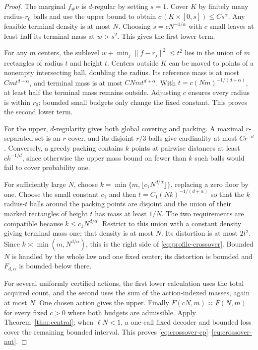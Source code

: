 \begin{proof}
The marginal $f_\#\nu$ is $d$-regular by setting $s=1$. Cover $K$ by finitely many radius-$r_0$ balls and use the upper bound to obtain
$\sigma(K\times[0,s])\le C s^\alpha$. Any feasible terminal density is at most $N$. Choosing $s=cN^{-1/\alpha}$ with $c$ small leaves at least half its terminal mass at $w>s^2$. This gives the first lower term.

For any $m$ centers, the sublevel $w+\min_j\|f-r_j\|^2\le t^2$ lies in the union of $m$ rectangles of radius $t$ and height $t$. Centers outside $K$ can be moved to points of a nonempty intersecting ball, doubling the radius. Its reference mass is at most $Cmt^{d+\alpha}$, and terminal mass is at most $CNmt^{d+\alpha}$. With $t=c(Nm)^{-1/(d+\alpha)}$, at least half the terminal mass remains outside. Adjusting $c$ ensures every radius is within $r_0$; bounded small budgets only change the fixed constant. This proves the second lower term.

For the upper, $d$-regularity gives both global covering and packing. A maximal $r$-separated set is an $r$-cover, and its disjoint $r/3$ balls give cardinality at most $Cr^{-d}$. Conversely, a greedy packing contains $k$ points at pairwise distances at least $c k^{-1/d}$, since otherwise the upper mass bound on fewer than $k$ such balls would fail to cover probability one.

For sufficiently large $N$, choose
$k=\min\{m,\lfloor c_1N^{d/\alpha}\rfloor\}$, replacing a zero floor by one. Choose the small constant $c_1$ and then
$t=C_1(Nk)^{-1/(d+\alpha)}$ so that the $k$ radius-$t$ balls around the packing points are disjoint and the union of their marked rectangles of height $t$ has mass at least $1/N$. The two requirements are compatible because $k\le c_1N^{d/\alpha}$. Restrict to this union with a constant density giving terminal mass one; that density is at most $N$. Its distortion is at most $2t^2$. Since $k\asymp\min(m,N^{d/\alpha})$, this is the right side of \eqref{eq:profile-crossover}. Bounded $N$ is handled by the whole law and one fixed center; its distortion is bounded and $F_{d,\alpha}$ is bounded below there.

For several uniformly certified actions, the first lower calculation uses the total acquired count, and the second uses the sum of the action-indexed masses, again at most $N$. One chosen action gives the upper. Finally $F(cN,m)\asymp F(N,m)$ for every fixed $c>0$ where both budgets are admissible. Apply Theorem~\ref{thm:central}; when $\ell N<1$, a one-call fixed decoder and bounded loss cover the remaining bounded interval. This proves \eqref{eq:crossover-cp}--\eqref{eq:crossover-aut}.
\end{proof}

